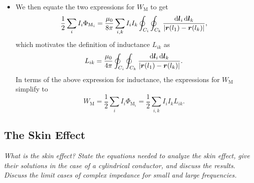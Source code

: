 \documentclass[11pt, a4paper]{article}
\newcommand{\diff}{\mathop{}\!\mathrm{d}} %
\renewcommand{\vec}[1]{\bm{#1}} %
\renewcommand{\r}{\vec{r}}
\newcommand{\mm}{\mu_{0}}  %
\begin{document}
\begin{itemize}
	\item We then equate the two expressions for $ W_{\text{M}} $ to get
	\begin{equation*}
		\frac{1}{2}\sum_{i}I_{i}\Phi_{\text{M}_{i}} = \frac{\mm}{8\pi}\sum_{i, k}I_{i}I_{k}\oint_{C_{i}}\oint_{C_{k}}\frac{\diff \vec{l}_{i}\diff \vec{l}_{k}}{\abs{\r(l_{1}) - \r(l_{k})}},
	\end{equation*}
    which motivates the definition of inductance $ L_{ik} $ as
	\begin{equation*}
		L_{ik} = \frac{\mm}{4\pi}\oint_{C_{i}}\oint_{C_{k}}\frac{\diff \vec{l}_{i}\diff \vec{l}_{k}}{\abs{\r(l_{1}) - \r(l_{k})}}.
	\end{equation*}
    In terms of the above expression for inductance, the expressions for $ W_{\text{M}} $ simplify to
	\begin{equation*}
        W_{\text{M}} = \frac{1}{2}\sum_{i}I_{i}\Phi_{\text{M}_{i}} = \frac{1}{2} \sum_{i, k}I_{i}I_{k} L_{ik}.
	\end{equation*}

\end{itemize}

    
\subsection{The Skin Effect}
\textit{What is the skin effect? State the equations needed to analyze the skin effect, give their solutions in the case of a cylindrical conductor, and discuss the results. Discuss the limit cases of complex impedance for small and large frequencies.}
\end{document}
